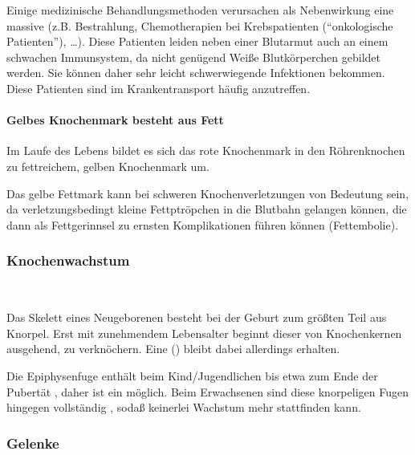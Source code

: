 
Einige medizinische Behandlungsmethoden
verursachen als Nebenwirkung eine massive  (z.B.
Bestrahlung, Chemotherapien bei Krebspatienten ("`onkologische
Patienten"'), \ldots). Diese Patienten leiden neben einer
Blutarmut auch an einem schwachen Immunsystem, da nicht genügend Weiße Blutkörperchen gebildet werden. Sie können daher sehr
leicht schwerwiegende Infektionen bekommen. Diese Patienten
sind im Krankentransport häufig anzutreffen. 

\paragraph{Gelbes Knochenmark besteht aus Fett} 

Im Laufe des Lebens bildet es sich das rote Knochenmark in den
Röhrenknochen zu fettreichem, gelben Knochenmark um. 

Das gelbe Fettmark kann bei schweren Knochenverletzungen von Bedeutung
sein, da verletzungs\-bedingt kleine Fettptröpchen in die Blutbahn
gelangen können, die dann als Fettgerinnsel  zu ernsten
Komplikationen führen können
(Fettembolie).

\subsubsection{Knochenwachstum}~

Das Skelett eines Neugeborenen besteht bei der Geburt zum größten
Teil aus Knorpel. Erst mit zunehmendem Lebensalter beginnt dieser von
Knochenkernen ausgehend, zu verknöchern. Eine
() bleibt dabei allerdings erhalten.

Die Epiphysenfuge enthält beim Kind/Jugendlichen bis
etwa zum Ende der Pubertät , daher ist ein 
möglich. Beim Erwachsenen sind diese knorpeligen Fugen
hingegen vollständig , sodaß
keinerlei Wachstum mehr stattfinden kann.

\subsubsection{Gelenke}

